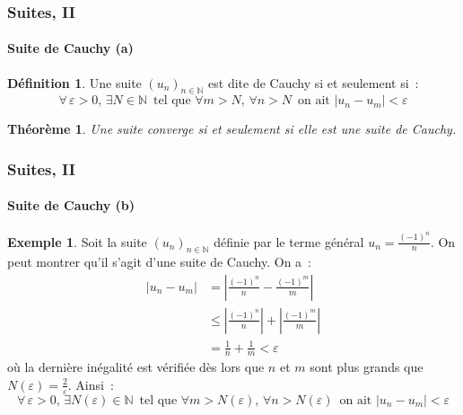 \documentclass[10pt,notheorems]{beamer}
\theoremstyle{plain}
\newtheorem{theorem}{Théorème}
\theoremstyle{definition} %
\newtheorem{definition}{Définition}
\newtheorem{example}{Exemple}
\begin{document}
\begin{frame}
  \frametitle{Suites, II}
  \framesubtitle{Suite de Cauchy (a)}
  \hypertarget{slide_suite_cauchy_1}{}

  \bigskip

  \begin{definition}
    Une suite $(u_n)_{n\in\mathbb N}$ est dite de Cauchy si et seulement si~:
    \[
      \forall\,\varepsilon>0,\, \exists N\in\mathbb N\,\text{ tel que } \forall m>N,\, \forall n>N\, \text{ on ait }|u_n-u_m|<\varepsilon
    \]
  \end{definition}

  \bigskip

  \begin{theorem}
    Une suite converge si et seulement si elle est une suite de Cauchy.
  \end{theorem}

\end{frame}


\begin{frame}
  \frametitle{Suites, II}
  \framesubtitle{Suite de Cauchy (b)}
  \hypertarget{slide_suite_cauchy_1}{}

  \bigskip

  \begin{example}
    Soit la suite $(u_n)_{n\in\mathbb N}$ définie par le terme général $u_n = \frac{(-1)^n}{n}$. On peut montrer qu'il s'agit d'une suite de Cauchy. On a~:
    \[
      \begin{split}
        |u_n-u_m| &= \left|\frac{(-1)^n}{n}-\frac{(-1)^m}{m}\right|\\
        &\leq \left|\frac{(-1)^n}{n}\right|+\left|\frac{(-1)^m}{m}\right|\\
        &= \frac{1}{n} + \frac{1}{m} < \varepsilon
      \end{split}
    \]
    où la dernière inégalité est vérifiée dès lors que $n$ et $m$ sont plus grands que $N(\varepsilon)=\frac{2}{\varepsilon}$. Ainsi~:
    \[
      \forall\,\varepsilon>0,\, \exists N(\varepsilon)\in\mathbb N\,\text{ tel que } \forall m>N(\varepsilon),\, \forall n>N(\varepsilon)\, \text{ on ait }|u_n-u_m|<\varepsilon
    \]
  \end{example}

\end{frame}
\end{document}
